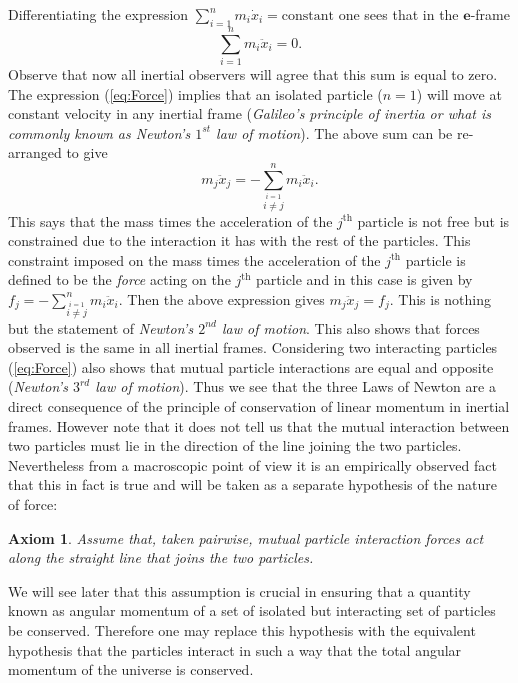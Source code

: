 \documentclass[graybox,envcountchap,sectrefs]{svmonoMuga}
\newtheorem{axiom}{Axiom}[chapter]
\begin{document}
Differentiating the expression $\sum_{i=1}^{n}m_i\dot{x}_i=\mathrm{constant}$ one sees that in the $\mathbf{e}$-frame
\begin{equation}\label{eq:Force}
\sum_{i=1}^{n}m_i\ddot{x}_i=0.
\end{equation}
Observe that now all inertial observers will agree that this sum is equal to zero. The expression (\ref{eq:Force}) implies that an isolated particle ($n=1$) will move at constant velocity in any inertial frame (\textit{Galileo's principle of inertia or what is commonly known as Newton's $1^{st}$ law of motion}).
The above sum can be re-arranged to give
\[
m_j\ddot{x}_j=-\sum_{\stackrel{i=1}{i\neq j}}^{n}m_i\ddot{x}_i.
\]
This says that the mass times the acceleration of the $j^{\mathrm{th}}$ particle is not free but is constrained due to the interaction it has with the rest of the particles. This constraint imposed on the mass times the acceleration of the $j^{\mathrm{th}}$ particle is defined to be the \textit{force} acting on the  $j^{\mathrm{th}}$ particle and in this case is given by$f_j=-\sum_{\stackrel{i=1}{i\neq j}}^{n}m_i\ddot{x}_i$. Then the above expression gives $m_j\ddot{x}_j=f_j$.  This is nothing but the statement of \textit{Newton's $2^{nd}$ law of motion}. This also shows that forces observed is the same in all inertial frames.
Considering two interacting particles (\ref{eq:Force}) also shows that mutual particle interactions are equal and opposite (\textit{Newton's $3^{rd}$ law of motion}). Thus we see that the three Laws of Newton are a direct consequence of the principle of conservation of linear momentum in inertial frames.  However note that it does not tell us that the mutual interaction between two particles must lie in the direction of the line joining the two particles. Nevertheless from a macroscopic point of view it is an empirically observed fact that this in fact is true and will be taken as a separate hypothesis of the nature of force:
\begin{svgraybox}
\begin{axiom}\label{axiom:DirectionOfForces}
Assume that, taken pairwise, mutual particle interaction forces act along the straight line that joins the two particles.
\end{axiom} 
\end{svgraybox}
We will see later that this assumption is crucial in ensuring that a quantity known as angular momentum of a set of isolated but interacting set of particles be conserved. Therefore one may replace this hypothesis with the equivalent hypothesis that the particles interact in such a way that the total angular momentum of the universe is conserved.
\end{document}
